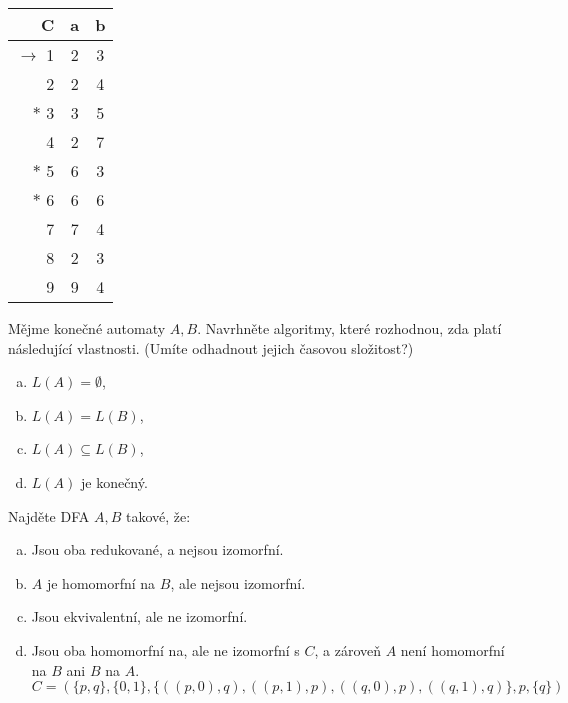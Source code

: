 \documentclass[a4paper,12pt]{amsart}
\begin{document}
\begin{problem}
\begin{multicols}{3}
        \begin{tabular}{ r | c c }
            C & a & b \\ \hline
            $\to$ 1 & 2 & 3 \\
            2 & 2 & 4 \\
            $\ast$ 3 & 3 & 5 \\
            4 & 2 & 7 \\
            $\ast$ 5 & 6 & 3 \\
            $\ast$ 6 & 6 & 6 \\
            7 & 7 & 4 \\
            8 & 2 & 3 \\
            9 & 9 & 4
        \end{tabular}

    \end{multicols}

\end{problem}


\medskip\begin{problem}

    Mějme konečné automaty $A,B$. Navrhněte algoritmy, které rozhodnou, zda platí následující vlastnosti. (Umíte odhadnout jejich časovou složitost?)

    \medskip
    
    \begin{multicols}{2}
    
        \begin{enumerate}[(a)]\setlength\itemsep{12pt}
            \item $L(A)=\emptyset$,
            \item $L(A)=L(B)$,
            \item $L(A)\subseteq L(B)$,
            \item $L(A)$ je konečný.
        \end{enumerate}

    \end{multicols}

\end{problem}


\medskip\begin{problem}

    Najděte DFA $A,B$ takové, že:  

    \begin{enumerate}[(a)]\setlength\itemsep{12pt}
        \item Jsou oba redukované, a nejsou izomorfní. 
        \item $A$ je homomorfní na $B$, ale nejsou izomorfní.
        \item Jsou ekvivalentní, ale ne izomorfní.
        \item Jsou oba homomorfní na, ale ne izomorfní s $C$, a zároveň $A$ není homomorfní na $B$ ani $B$ na $A$.
        $$
        C=(\{p,q\},\{0,1\},\{((p,0),q),((p,1),p),((q,0),p),((q,1),q)\},p,\{q\})
        $$
    \end{enumerate}

\end{problem}
\end{document}
